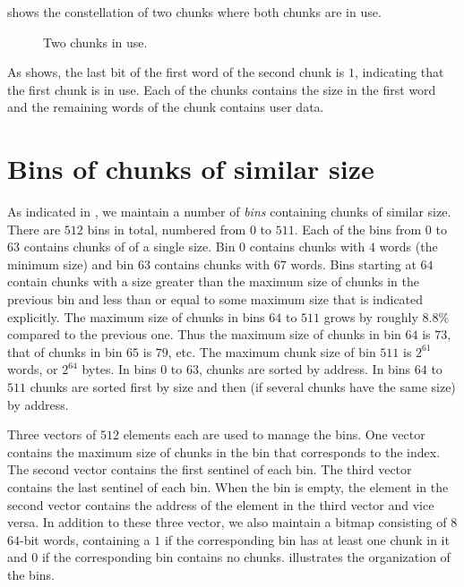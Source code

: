  shows the constellation of two chunks where both
chunks are in use.

\begin{figure}
\begin{center}
\end{center}
\caption{\label{fig-chunks4}
Two chunks in use.}
\end{figure}

As  shows, the last bit of the first word of the
second chunk is $1$, indicating that the first chunk is in use.  Each
of the chunks contains the size in the first word and the remaining
words of the chunk contains user data.

\section{Bins of chunks of similar size}
\label{sec-memory-allocator-bins-of-chunks}

As indicated in
, we maintain
a number of \emph{bins} containing chunks of similar size.  There are
$512$ bins in total, numbered from $0$ to $511$.  Each of the bins
from $0$ to $63$ contains chunks of of a single size.  Bin $0$
contains chunks with $4$ words (the minimum size) and bin $63$
contains chunks with $67$ words.  Bins starting at $64$ contain chunks
with a size greater than the maximum size of chunks in the previous
bin and less than or equal to some maximum size that is indicated
explicitly.  The maximum size of chunks in bins $64$ to $511$ grows by
roughly $8.8$\% compared to the previous one.  Thus the maximum size
of chunks in bin $64$ is $73$, that of chunks in bin $65$ is $79$,
etc.  The maximum chunk size of bin $511$ is $2^{61}$ words, or
$2^{64}$ bytes.  In bins $0$ to $63$, chunks are sorted by address.  In
bins $64$ to $511$ chunks are sorted first by size and then (if
several chunks have the same size) by address.

Three vectors of $512$ elements each are used to manage the bins.  One
vector contains the maximum size of chunks in the bin that corresponds
to the index.  The second vector contains the first sentinel of each
bin.  The third vector contains the last sentinel of each bin.  When
the bin is empty, the element in the second vector contains the
address of the element in the third vector and vice versa.  In
addition to these three vector, we also maintain a bitmap consisting
of $8$ $64$-bit words, containing a $1$ if the corresponding bin has
at least one chunk in it and $0$ if the corresponding bin contains no
chunks.   illustrates the organization of the bins.

